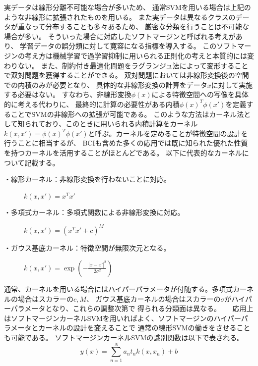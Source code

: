 実データは線形分離不可能な場合が多いため、
通常SVMを用いる場合は上記のような非線形に拡張されたものを用いる。
また実データは異なるクラスのデータが重なって分布することも多々あるため、
厳密な分類を行うことは不可能な場合が多い。
そういった場合に対応したソフトマージンと呼ばれる考えがあり、
学習データの誤分類に対して寛容になる指標を導入する。
このソフトマージンの考え方は機械学習で過学習抑制に用いられる正則化の考えと本質的には変わりない。
また、制約付き最適化問題をラグランジュ法によって変形することで双対問題を獲得することができる。
双対問題においては非線形変換後の空間での内積のみが必要となり、
具体的な非線形変換の計算をデータ\(x\)に対して実施する必要はない。
すなわち、非線形変換\(\phi(x)\)による特徴空間への写像を具体的に考える代わりに、
最終的に計算の必要性がある内積\(\phi(x)^T\phi(x')\)を定義することでSVMの非線形への拡張が可能である。
このような方法はカーネル法として知られており、このときに用いられる内積計算をカーネル
\(k(x,x')=\phi(x)^T\phi(x')\)と呼ぶ。カーネルを定めることが特徴空間の設計を行うことに相当するが、
BCIも含めた多くの応用では既に知られた優れた性質を持つカーネルを活用することがほとんどである。
以下に代表的なカーネルについて記載する。
\begin{description}
    \item[・線形カーネル：非線形変換を行わないことに対応。] \mbox{}
    \begin{center} \(k(x,x')=x^Tx'\) \end{center}
    \item[・多項式カーネル：多項式関数による非線形変換に対応。] \mbox{} 
    \begin{center} \(k(x,x')=(x^Tx' + c)^M\) \end{center}
    \item[・ガウス基底カーネル：特徴空間が無限次元となる。] \mbox{}\par
    \begin{center} \(k(x,x')=\exp\left(-\frac{|x-x'|^2}{2\sigma^2}\right)\) \end{center}
\end{description}
通常、カーネルを用いる場合にはハイパーパラメータが付随する。多項式カーネルの場合はスカラーの\(c,M\)、
ガウス基底カーネルの場合はスカラーの\(\sigma\)がハイパーパラメータとなり、これらの調整次第で
得られる分類面は異なる。
　
応用上はソフトマージンカーネルSVMを用いればよく、ソフトマージンのハイパーパラメータとカーネルの設計を変えることで
通常の線形SVMの働きをさせることも可能である。
ソフトマージンカーネルSVMの識別関数は以下で表される。
\begin{equation}
    y(x) = \sum_{n=1}^Na_nt_nk(x,x_n) + b
    \label{dis_kernel}
\end{equation}
